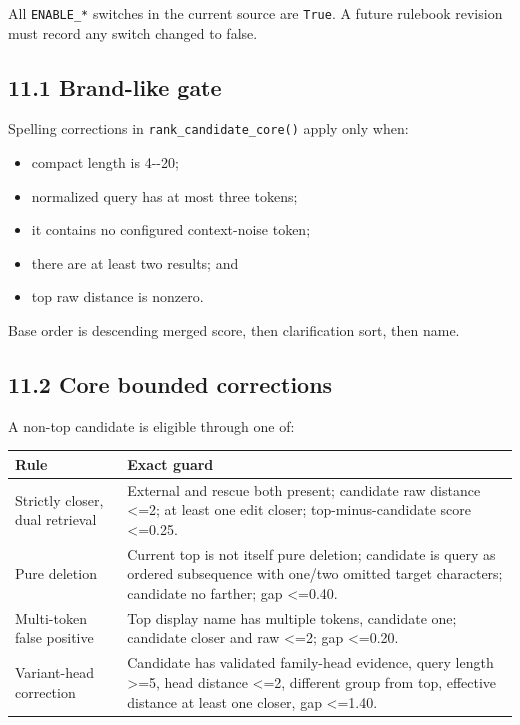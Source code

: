 All \texttt{ENABLE\_\allowbreak{}*} switches in the current source are \texttt{True}. A future rulebook revision must record any switch changed to false.

\subsection{11.1 Brand-like gate}\label{111-brand-like-gate}

Spelling corrections in \texttt{rank\_\allowbreak{}candidate\_\allowbreak{}core()} apply only when:

\begin{itemize}
\tightlist
\item
  compact length is 4-\/-20;
\item
  normalized query has at most three tokens;
\item
  it contains no configured context-noise token;
\item
  there are at least two results; and
\item
  top raw distance is nonzero.
\end{itemize}

Base order is descending merged score, then clarification sort, then name.

\subsection{11.2 Core bounded corrections}\label{112-core-bounded-corrections}

A non-top candidate is eligible through one of:

{\def\LTcaptype{none} %
\begin{longtable}[]{@{}>{\RaggedRight\arraybackslash}p{.27\linewidth}>{\RaggedRight\arraybackslash}p{.66\linewidth}@{}}
\toprule\noalign{}
Rule & Exact guard \\
\midrule\noalign{}
\endhead
\bottomrule\noalign{}
\endlastfoot
Strictly closer, dual retrieval & External and rescue both present; candidate raw distance \textless=2; at least one edit closer; top-minus-candidate score \textless=0.25. \\
Pure deletion & Current top is not itself pure deletion; candidate is query as ordered subsequence with one/two omitted target characters; candidate no farther; gap \textless=0.40. \\
Multi-token false positive & Top display name has multiple tokens, candidate one; candidate closer and raw \textless=2; gap \textless=0.20. \\
Variant-head correction & Candidate has validated family-head evidence, query length \textgreater=5, head distance \textless=2, different group from top, effective distance at least one closer, gap \textless=1.40. \\
\end{longtable}
}


